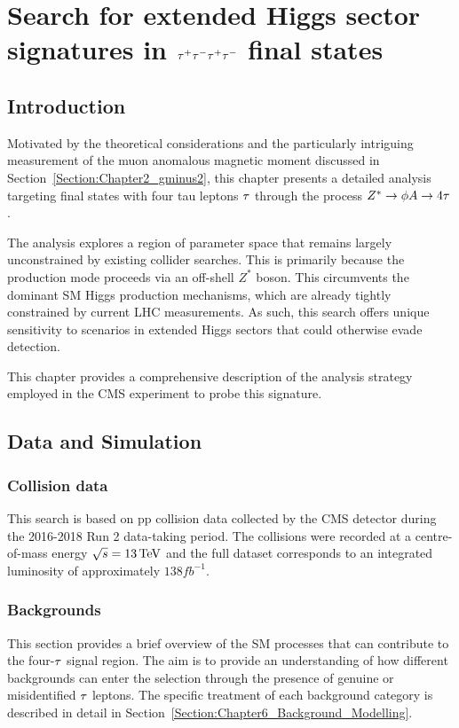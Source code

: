 \chapter{\texorpdfstring{Search for extended Higgs sector signatures in $\tau^+\tau^-\tau^+\tau^-$ final states}{Search for extended Higgs sector signatures in tautautautau final states}}
\thispagestyle{plain}  %
\pagestyle{chapterpages}
\label{Section:Chapter_4tau}
\minitoc

\section{Introduction}

Motivated by the theoretical considerations and the particularly intriguing measurement of the muon anomalous magnetic moment discussed in Section~\ref{Section:Chapter2_gminus2}, this chapter presents a detailed analysis targeting final states with four tau leptons $\tau$ through the process $Z^*\rightarrow\phi A\rightarrow4\tau$.

The analysis explores a region of parameter space that remains largely unconstrained by existing collider searches. This is primarily because the production mode proceeds via an off-shell $Z^*$ boson. This circumvents the dominant SM Higgs production mechanisms, which are already tightly constrained by current LHC measurements. As such, this search offers unique sensitivity to scenarios in extended Higgs sectors that could otherwise evade detection.

This chapter provides a comprehensive description of the analysis strategy employed in the CMS experiment to probe this signature. 
\section{Data and Simulation}
\subsection{Collision data}

This search is based on pp collision data collected by the CMS detector during the 2016-2018 Run 2 data-taking period. The collisions were recorded at a centre-of-mass energy $\sqrt{s} = 13\,\text{Te\hspace{-.08em}V}$ and the full dataset corresponds to an integrated luminosity of approximately $138\unit{fb}^{-1}$.

\subsection{Backgrounds}
\label{Section:Chapter6_Backgrounds}
This section provides a brief overview of the SM processes that can contribute to the four-$\tau$ signal region. The aim is to provide an understanding of how different backgrounds can enter the selection through the presence of genuine or misidentified $\tau$ leptons. The specific treatment of each background category is described in detail in Section~\ref{Section:Chapter6_Background_Modelling}.

